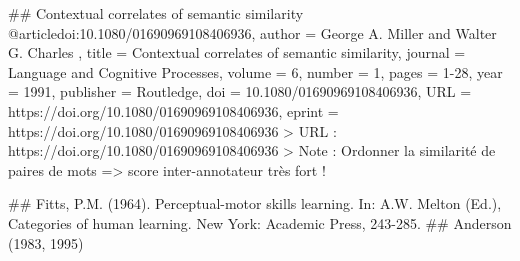 	
	## Contextual correlates of semantic similarity
	@article{doi:10.1080/01690969108406936,
		author = { George A.   Miller  and  Walter G.   Charles },
		title = {Contextual correlates of semantic similarity},
		journal = {Language and Cognitive Processes},
		volume = {6},
		number = {1},
		pages = {1-28},
		year  = {1991},
		publisher = {Routledge},
		doi = {10.1080/01690969108406936},
		URL = {https://doi.org/10.1080/01690969108406936},
		eprint = {https://doi.org/10.1080/01690969108406936}
	}
	> URL : https://doi.org/10.1080/01690969108406936
	> Note : Ordonner la similarité de paires de mots => score inter-annotateur très fort !
	
	## Fitts, P.M. (1964). Perceptual-motor skills learning. In: A.W. Melton (Ed.), Categories of human learning. New York: Academic Press, 243-285.
	## Anderson (1983, 1995)